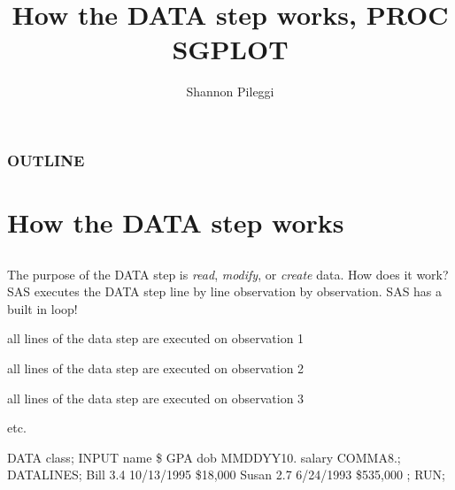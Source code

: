 



\title[Lecture 10]{How the DATA step works, PROC SGPLOT}
\author[Pileggi]{Shannon Pileggi}


\date{}




\begin{frame}
\titlepage
\end{frame}

\begin{frame}
\frametitle{OUTLINE\qquad\qquad\qquad} \tableofcontents[hideallsubsections]
\end{frame}


\section[How the DATA step works]{How the DATA step works}
\subsection{}

\begin{frame}
The purpose of the DATA step is \emph{read}, \emph{modify}, or \emph{create} data.  How does it work?  SAS executes the DATA step line by line  observation by observation.
\vskip10pt
SAS has a built in loop!
\bi
\item all lines of the data step are executed on observation 1
\item all lines of the data step are executed on observation 2
\item all lines of the data step are executed on observation 3
\item etc.
\ei
\end{frame}

\begin{frame}[fragile]
\footnotesize
\begin{code}{.0}
DATA class;
  INPUT name \$ GPA dob MMDDYY10. salary COMMA8.;
  DATALINES;
  Bill  3.4  10/13/1995 \$18,000
  Susan 2.7  6/24/1993  \$535,000
  ;
RUN;
\end{code}
\emp
\end{frame}

